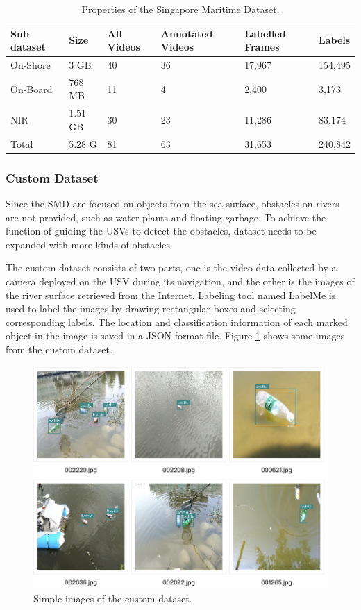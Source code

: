 \documentclass[sensors,article,submit,moreauthors,pdftex]{Definitions/mdpi}
\begin{document}
\begin{paracol}{2}
\begin{table}[htbp]
\centering
\caption{Properties of the Singapore Maritime Dataset.}
\begin{tabular}{llllll} 
\toprule
\textbf{Sub dataset}&\textbf{Size}&\textbf{All Videos}&\textbf{Annotated Videos}&\textbf{Labelled Frames}& \textbf{Labels}\\
\midrule
On-Shore & 3 GB& 40 & 36 & 17,967& 154,495\\
On-Board & 768 MB&  11 &4 &2,400& 3,173\\
NIR& 1.51 GB&  30&23 & 11,286& 83,174\\
\cmidrule(r){1-6}
Total& 5.28 G&  81 &63 & 31,653 &240,842\\
\bottomrule
\end{tabular}
\label{tbl:Properties of Singapore Maritime Dataset}
\end{table}


\subsubsection{Custom Dataset}

Since the SMD are focused on objects from the sea surface, obstacles on rivers are not provided, such as water plants and floating garbage. To achieve the function of guiding the USVs to detect the obstacles, dataset needs to be expanded with more kinds of obstacles.

The custom dataset consists of two parts, one is the video data collected by a camera deployed on the USV during its navigation, and the other is the images of the river surface retrieved from the Internet. Labeling tool named LabelMe is used to label the images by drawing rectangular boxes and selecting corresponding labels. The location and classification information of each marked object in the image is saved in a JSON format file. Figure \ref{fig:Simple images of the custom dataset} shows some images from the custom dataset. 

\begin{figure}[htbp]
\centering
\includegraphics[width=1\columnwidth]{images/custom-dataset-example.png}
\caption{Simple images of the custom dataset.}
\label{fig:Simple images of the custom dataset}
\end{figure}



\end{paracol}
\end{document}
